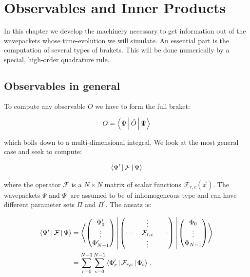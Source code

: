 \chapter{Observables and Inner Products}
\label{ch:observables}

In this chapter we develop the machinery necessary to get information out of the
wavepackets whose time-evolution we will simulate. An essential part is the computation
of several types of brakets. This will be done numerically by a special, high-order
quadrature rule.


\section{Observables in general}


To compute any observable $O$ we have to form the full braket:

\begin{equation}
  O = \Braket{\Psi | \hat{O} | \Psi}
\end{equation}

which boils down to a multi-dimensional integral. We look at the most general
case and seek to compute:

\begin{equation}
  \Braket{\Psi^\prime | \mathcal{F} | \Psi}
\end{equation}

where the operator $\mathcal{F}$ is a $N \times N$ matrix of scalar functions
$\mathcal{F}_{r,c}(\vec{x})$. The wavepackets $\Psi$ and $\Psi^\prime$ are
assumed to be of inhomogeneous type and can have different parameter sets
$\Pi$ and $\Pi^\prime$. The ansatz is:

\begin{align*}
  \Braket{\Psi^\prime | \mathcal{F} | \Psi} & =
  \Braket{
    \begin{pmatrix}
      \Phi_0^\prime \\ \vdots \\ \Phi_{N-1}^\prime
    \end{pmatrix}
    |
    \begin{pmatrix}
      {}     & \vdots            & {} \\
      \cdots & \mathcal{F}_{r,c} & \cdots \\
      {}     & \vdots            & {}
    \end{pmatrix}
    |
    \begin{pmatrix}
      \Phi_0 \\ \vdots \\ \Phi_{N-1}
    \end{pmatrix}
  } \\
  & =
  \sum_{r=0}^{N-1} \sum_{c=0}^{N-1}
  \Braket{\Phi_r^\prime | \mathcal{F}_{r,c} | \Phi_c} \,.
\end{align*}

